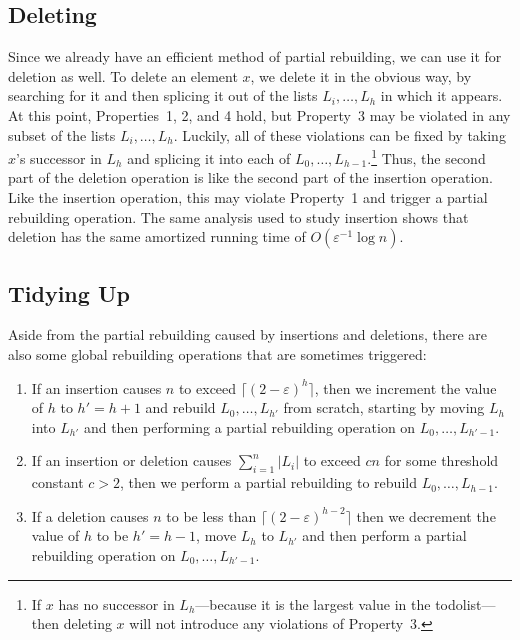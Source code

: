 \documentclass[lotsofwhite]{patmorin}
\newcommand{\eps}{\varepsilon}
\begin{document}
\subsection{Deleting}

Since we already have an efficient method of partial rebuilding, we
can use it for deletion as well. To delete an element $x$, we delete
it in the obvious way, by searching for it and then splicing it out
of the lists $L_i,\ldots,L_h$ in which it appears.  At this point,
Properties~1, 2, and 4 hold, but Property~3 may be violated in any
subset of the lists $L_i,\ldots,L_h$.  Luckily, all of these violations
can be fixed by taking $x$'s successor in $L_h$ and splicing it into
each of $L_0,\ldots,L_{h-1}$.\footnote{If $x$ has no successor in
$L_h$---because it is the largest value in the todolist---then deleting
$x$ will not introduce any violations of Property~3.}  Thus, the second
part of the deletion operation is like the second part of the insertion
operation.  Like the insertion operation, this may violate Property~1
and trigger a partial rebuilding operation.  The same analysis used to
study insertion shows that deletion has the same amortized running time
of $O(\eps^{-1}\log n)$.

\subsection{Tidying Up}

Aside from the partial rebuilding caused by insertions and deletions, there are also some global rebuilding operations that are sometimes triggered:
\begin{enumerate}
\item If an insertion causes $n$ to exceed $\lceil(2-\eps)^h\rceil$, then
we increment the value of $h$ to $h'=h+1$ and rebuild $L_0,\ldots,L_{h'}$
from scratch, starting by moving $L_h$ into $L_{h'}$ and then performing
a partial rebuilding operation on $L_{0},\ldots,L_{h'-1}$.
\item If an insertion or deletion causes $\sum_{i=1}^n |L_i|$ to exceed $cn$ for some threshold constant $c>2$, then we perform a partial rebuilding to rebuild $L_{0},\ldots,L_{h-1}$.
\item If a deletion causes $n$ to be less than $\lceil(2-\eps)^{h-2}\rceil$ then we decrement the value of $h$ to be $h'=h-1$, move $L_h$ to $L_{h'}$ and then perform a partial rebuilding operation on $L_{0},\ldots,L_{h'-1}$. 
\end{enumerate}
\end{document}

